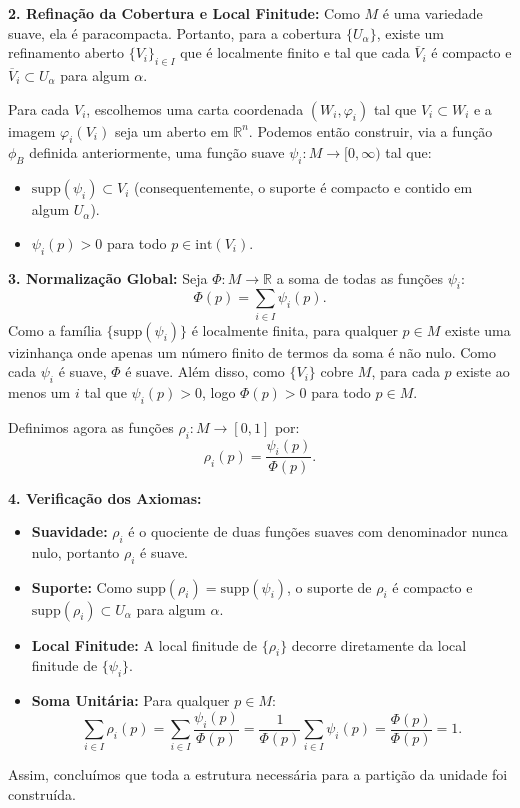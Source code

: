 {	\textbf{2. Refinação da Cobertura e Local Finitude:}
	Como $M$ é uma variedade suave, ela é paracompacta. Portanto, para a cobertura $\{U_\alpha\}$, existe um refinamento aberto $\{V_i\}_{i \in I}$ que é localmente finito e tal que cada $\overline{V}_i$ é compacto e $\overline{V}_i \subset U_\alpha$ para algum $\alpha$. 
	
	Para cada $V_i$, escolhemos uma carta coordenada $(W_i, \varphi_i)$ tal que $V_i \subset W_i$ e a imagem $\varphi_i(V_i)$ seja um aberto em $\mathbb{R}^n$. Podemos então construir, via a função $\phi_B$ definida anteriormente, uma função suave $\psi_i : M \to [0, \infty)$ tal que:
	\begin{itemize}
		\item $\text{supp}(\psi_i) \subset V_i$ (consequentemente, o suporte é compacto e contido em algum $U_\alpha$).
		\item $\psi_i(p) > 0$ para todo $p \in \text{int}(V_i)$.
	\end{itemize}
	
	\textbf{3. Normalização Global:}
	Seja $\Phi : M \to \mathbb{R}$ a soma de todas as funções $\psi_i$:
	\begin{equation*}
		\Phi(p) = \sum_{i \in I} \psi_i(p).
	\end{equation*}
	Como a família $\{\text{supp}(\psi_i)\}$ é localmente finita, para qualquer $p \in M$ existe uma vizinhança onde apenas um número finito de termos da soma é não nulo. Como cada $\psi_i$ é suave, $\Phi$ é suave. Além disso, como $\{V_i\}$ cobre $M$, para cada $p$ existe ao menos um $i$ tal que $\psi_i(p) > 0$, logo $\Phi(p) > 0$ para todo $p \in M$.
	
	Definimos agora as funções $\rho_i : M \to [0, 1]$ por:
	\begin{equation*}
		\rho_i(p) = \frac{\psi_i(p)}{\Phi(p)}.
	\end{equation*}
	
	\textbf{4. Verificação dos Axiomas:}
	\begin{itemize}
		\item \textbf{Suavidade:} $\rho_i$ é o quociente de duas funções suaves com denominador nunca nulo, portanto $\rho_i$ é suave.
		\item \textbf{Suporte:} Como $\text{supp}(\rho_i) = \text{supp}(\psi_i)$, o suporte de $\rho_i$ é compacto e $\text{supp}(\rho_i) \subset U_\alpha$ para algum $\alpha$.
		\item \textbf{Local Finitude:} A local finitude de $\{\rho_i\}$ decorre diretamente da local finitude de $\{\psi_i\}$.
		\item \textbf{Soma Unitária:} Para qualquer $p \in M$:
		\begin{equation*}
			\sum_{i \in I} \rho_i(p) = \sum_{i \in I} \frac{\psi_i(p)}{\Phi(p)} = \frac{1}{\Phi(p)} \sum_{i \in I} \psi_i(p) = \frac{\Phi(p)}{\Phi(p)} = 1.
		\end{equation*}
	\end{itemize}
	
	Assim, concluímos que toda a estrutura necessária para a partição da unidade foi construída.
}
